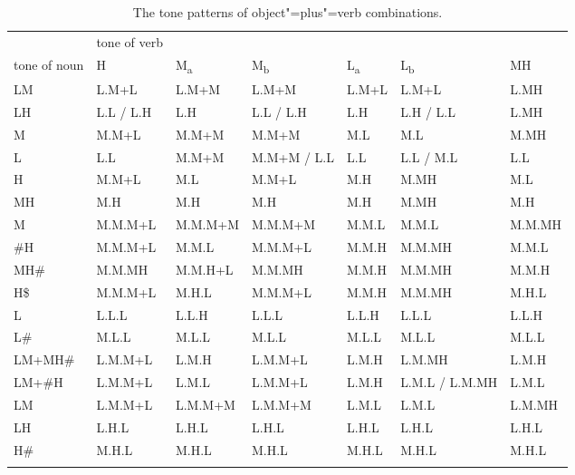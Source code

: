 \begin{table}
\caption{\label{tab:thetonepatternsofobjectverbcombinations}The tone patterns of object"=plus"=verb combinations.}
{\renewcommand{\arraystretch}{1.1}
\begin{tabularx}{\textheight}{ l@{\hspace{6mm}} Q l@{\hspace{6mm}} l@{\hspace{6mm}} l@{\hspace{6mm}} l@{\hspace{6mm}} Q }
\lsptoprule
 & tone of verb\\
	tone of noun & H & M\textsubscript{a} & M\textsubscript{b} & L\textsubscript{a} & L\textsubscript{b} & MH\\ \midrule
		LM & L.M+L & L.M+M & L.M+M & L.M+L & L.M+L & L.MH\\
	LH & L.L / L.H & L.H & L.L / L.H & L.H & L.H / L.L & L.MH\\
	M & M.M+L & M.M+M & M.M+M & M.L & M.L & M.MH\\
	L & L.L & M.M+M & M.M+M / L.L & L.L & L.L / M.L & L.L\\
	H & M.M+L & M.L & M.M+L & M.H & M.MH & M.L\\
	MH & M.H & M.H & M.H & M.H & M.MH & M.H\\  \addlinespace \hdashline \addlinespace
	M & M.M.M+L & M.M.M+M & M.M.M+M & M.M.L & M.M.L & M.M.MH\\
	\#H & M.M.M+L & M.M.L & M.M.M+L & M.M.H & M.M.MH & M.M.L\\
	MH\# & M.M.MH & M.M.H+L & M.M.MH & M.M.H & M.M.MH & M.M.H\\
	H\$ & M.M.M+L & M.H.L & M.M.M+L & M.M.H & M.M.MH & M.H.L\\
	L & L.L.L & L.L.H & L.L.L & L.L.H & L.L.L & L.L.H\\
	L\# & M.L.L & M.L.L & M.L.L & M.L.L & M.L.L & M.L.L\\
	LM+MH\# & L.M.M+L & L.M.H & L.M.M+L & L.M.H & L.M.MH & L.M.H\\
	LM+\#H & L.M.M+L & L.M.L & L.M.M+L & L.M.H & L.M.L / L.M.MH & L.M.L\\
	LM & L.M.M+L & L.M.M+M & L.M.M+M & L.M.L & L.M.L & L.M.MH\\
	LH & L.H.L & L.H.L & L.H.L & L.H.L & L.H.L & L.H.L\\
	H\# & M.H.L & M.H.L & M.H.L & M.H.L & M.H.L & M.H.L\\
\lspbottomrule
\end{tabularx}}
\end{table}

